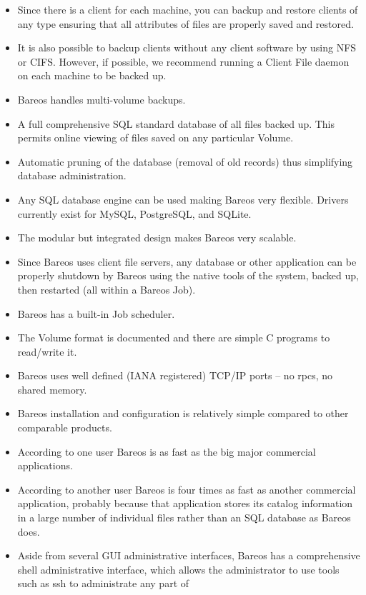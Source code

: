 \begin{itemize}
\item Since there is a client for each machine, you can backup
   and restore clients of any type ensuring that all attributes
   of files are properly saved and restored.
\item It is also possible to backup clients without any client
   software by using NFS or CIFS.  However, if possible, we
   recommend running a Client File daemon on each machine to be
   backed up.
\item Bareos handles multi-volume backups.
\item A full comprehensive SQL standard database of all files backed up.  This
   permits online viewing of files saved on any particular  Volume.
\item Automatic pruning of the database (removal of old records) thus
   simplifying database administration.
\item Any SQL database engine can be used making Bareos very flexible.
      Drivers currently exist for MySQL, PostgreSQL, and SQLite.
\item The modular but integrated design makes Bareos very scalable.
\item Since Bareos uses client file servers, any database or
   other application can be properly shutdown by Bareos using the
   native tools of the system, backed up, then restarted (all
   within a Bareos Job).
\item Bareos has a built-in Job scheduler.
\item The Volume format is documented and there are simple C programs to
   read/write it.
\item Bareos uses well defined (IANA registered) TCP/IP ports -- no rpcs,  no
   shared memory.
\item Bareos installation and configuration is relatively simple compared  to
   other comparable products.
\item According to one user Bareos is as fast as the big major commercial
   applications.
\item According to another user Bareos is four times as fast as another
   commercial application, probably because that application  stores its catalog
   information in a large number of individual  files rather than an SQL database
   as Bareos does.
\item Aside from several GUI administrative interfaces, Bareos has a
   comprehensive shell administrative interface, which allows the
   administrator to use tools such as ssh to administrate any part of

\end{itemize}
